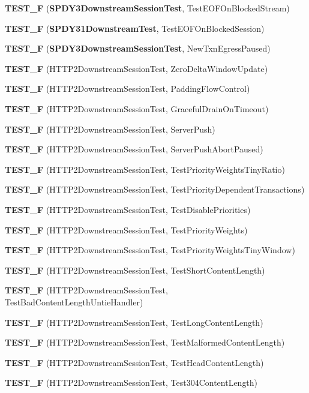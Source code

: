 \begin{DoxyCompactItemize}
{\bf T\+E\+S\+T\+\_\+F} ({\bf S\+P\+D\+Y3\+Downstream\+Session\+Test}, Test\+E\+O\+F\+On\+Blocked\+Stream)
\item 
{\bf T\+E\+S\+T\+\_\+F} ({\bf S\+P\+D\+Y31\+Downstream\+Test}, Test\+E\+O\+F\+On\+Blocked\+Session)
\item 
{\bf T\+E\+S\+T\+\_\+F} ({\bf S\+P\+D\+Y3\+Downstream\+Session\+Test}, New\+Txn\+Egress\+Paused)
\item 
{\bf T\+E\+S\+T\+\_\+F} (H\+T\+T\+P2\+Downstream\+Session\+Test, Zero\+Delta\+Window\+Update)
\item 
{\bf T\+E\+S\+T\+\_\+F} (H\+T\+T\+P2\+Downstream\+Session\+Test, Padding\+Flow\+Control)
\item 
{\bf T\+E\+S\+T\+\_\+F} (H\+T\+T\+P2\+Downstream\+Session\+Test, Graceful\+Drain\+On\+Timeout)
\item 
{\bf T\+E\+S\+T\+\_\+F} (H\+T\+T\+P2\+Downstream\+Session\+Test, Server\+Push)
\item 
{\bf T\+E\+S\+T\+\_\+F} (H\+T\+T\+P2\+Downstream\+Session\+Test, Server\+Push\+Abort\+Paused)
\item 
{\bf T\+E\+S\+T\+\_\+F} (H\+T\+T\+P2\+Downstream\+Session\+Test, Test\+Priority\+Weights\+Tiny\+Ratio)
\item 
{\bf T\+E\+S\+T\+\_\+F} (H\+T\+T\+P2\+Downstream\+Session\+Test, Test\+Priority\+Dependent\+Transactions)
\item 
{\bf T\+E\+S\+T\+\_\+F} (H\+T\+T\+P2\+Downstream\+Session\+Test, Test\+Disable\+Priorities)
\item 
{\bf T\+E\+S\+T\+\_\+F} (H\+T\+T\+P2\+Downstream\+Session\+Test, Test\+Priority\+Weights)
\item 
{\bf T\+E\+S\+T\+\_\+F} (H\+T\+T\+P2\+Downstream\+Session\+Test, Test\+Priority\+Weights\+Tiny\+Window)
\item 
{\bf T\+E\+S\+T\+\_\+F} (H\+T\+T\+P2\+Downstream\+Session\+Test, Test\+Short\+Content\+Length)
\item 
{\bf T\+E\+S\+T\+\_\+F} (H\+T\+T\+P2\+Downstream\+Session\+Test, Test\+Bad\+Content\+Length\+Untie\+Handler)
\item 
{\bf T\+E\+S\+T\+\_\+F} (H\+T\+T\+P2\+Downstream\+Session\+Test, Test\+Long\+Content\+Length)
\item 
{\bf T\+E\+S\+T\+\_\+F} (H\+T\+T\+P2\+Downstream\+Session\+Test, Test\+Malformed\+Content\+Length)
\item 
{\bf T\+E\+S\+T\+\_\+F} (H\+T\+T\+P2\+Downstream\+Session\+Test, Test\+Head\+Content\+Length)
\item 
{\bf T\+E\+S\+T\+\_\+F} (H\+T\+T\+P2\+Downstream\+Session\+Test, Test304\+Content\+Length)

\end{DoxyCompactItemize}
